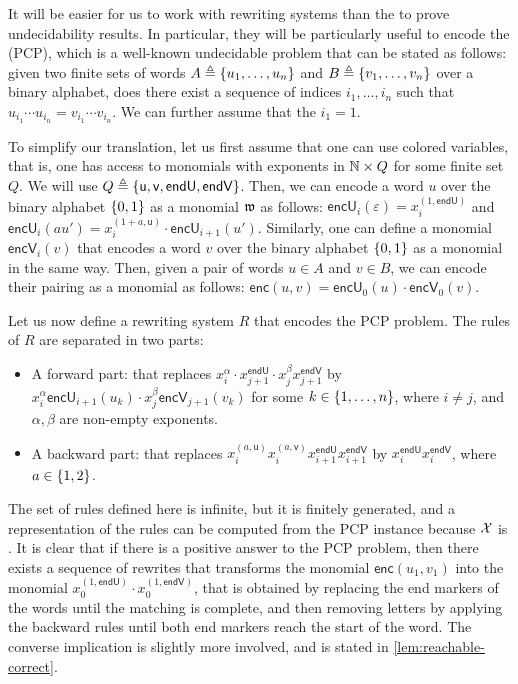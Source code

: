 \AP It will be easier for us to work with rewriting systems than the
 to prove undecidability results. In
particular, they will be particularly useful to encode the  (PCP), which is a well-known undecidable problem that
can be stated as follows: given two finite sets of words $A \triangleq \{ u_1,
\dots, u_n \}$ and $B \triangleq \{ v_1, \dots, v_n \}$ over a binary alphabet,
does there exist a sequence of indices $i_1, \ldots, i_n$ such that $u_{i_1}
\cdots u_{i_n} = v_{i_1} \cdots v_{i_n}$. We can further assume that the
$i_1 = 1$.

\AP To simplify our translation, let us first assume that one can use colored
variables, that is, one has access to monomials with exponents in $\mathbb{N} \times Q$
for some finite set $Q$. We will use $Q \triangleq \{  \mathsf{u}, \mathsf{v},
\mathsf{endU}, \mathsf{endV}  \}$. Then, we can encode a word $u$ over the binary
alphabet $\{ 0, 1 \}$ as a monomial $\monelt[w]$ as follows: $\mathsf{encU}_{i}
(\varepsilon) = x_i^{(1, \mathsf{endU})}$ and $\mathsf{encU}_{i} (a u') =
x_i^{(1 + a, \mathsf{u})} \cdot \mathsf{encU}_{i+1} (u')$. Similarly, one can
define a monomial $\mathsf{encV}_{i} (v)$ that encodes a word $v$ over the
binary alphabet $\{ 0, 1 \}$ as a monomial in the same way. Then, given a pair
of words $u \in A$ and $v \in B$, we can encode their pairing as a monomial
as follows: $\mathsf{enc} (u,v) = \mathsf{encU}_0(u) \cdot
\mathsf{encV}_0 (v)$.

Let us now define a rewriting system $R$ that encodes the PCP problem. The
rules of $R$ are separated in two parts:
\begin{itemize}
  \item A forward part: that replaces
    $x_i^{\alpha} \cdot x_{j+1}^{\mathsf{endU}} \cdot x_{j}^{\beta} x_{j+1}^{\mathsf{endV}}$
    by 
    $x_i^{\alpha} \mathsf{encU}_{i+1}(u_k) \cdot x_{j}^{\beta} \mathsf{encV}_{j+1}(v_k)$
    for some $k \in \{ 1, \ldots, n \}$,
    where $i \neq j$,
    and $\alpha, \beta$ are non-empty exponents.
  \item A backward part: that replaces
    $x_i^{(a, \mathsf{u})}
     x_i^{(a, \mathsf{v})}
     x_{i+1}^{\mathsf{endU}}
     x_{i+1}^{\mathsf{endV}}$
    by 
     $x_{i}^{\mathsf{endU}}
      x_{i}^{\mathsf{endV}}$, 
    where $a \in \{ 1, 2 \}$.
\end{itemize}

\AP The set of rules defined here is infinite, but it is finitely generated,
and a representation of the rules can be computed from the PCP instance because
$\mathcal{X}$ is . It is clear that if there is a
positive answer to the PCP problem, then there exists a sequence of rewrites
that transforms the monomial $\mathsf{enc} (u_1, v_1)$ into the monomial
$x_0^{(1, \mathsf{endU})} \cdot x_0^{(1, \mathsf{endV})}$, that is obtained by
replacing the end markers of the words until the matching is complete, and then
removing letters by applying the backward rules until both end markers reach
the start of the word.
The converse implication is slightly more involved, 
and is stated in \cref{lem:reachable-correct}.

